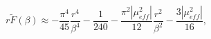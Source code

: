 \begin{equation}
r\widetilde{F}\left(\beta \right)\approx -\frac{\pi ^{4}}{45}\frac{r^{4}}{\beta ^{4}}-\frac{1}{240}-\frac{\pi ^{2}\left|\mu _{eff}^{2}\right|}{12}\frac{r^{2}}{\beta ^{2}}-\frac{3\left|\mu _{eff}^{2}\right|}{16},\end{equation}

